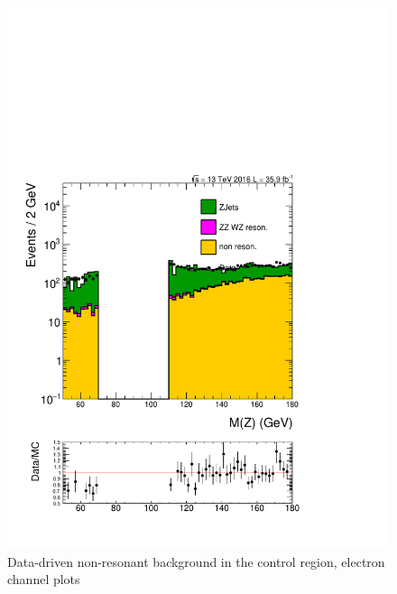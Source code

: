 \begin{figure}[htbp]
\begin{center}
\includegraphics[width=0.39\linewidth, page=4]{figures/test_metzpt50_RhoWt_puWeight68075_metfilter_el_.pdf}
\caption{Data-driven non-resonant background in the control region, electron channel plots}
\label{fig:nonreselcr}
\end{center}
\end{figure}

